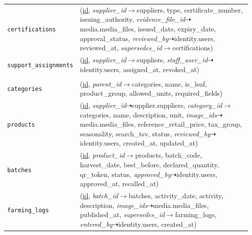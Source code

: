 \begin{longtable}{L{3.10cm} L{11.90cm}}
\texttt{certifications} & (\underline{id}, \textit{supplier\_\allowbreak{}id}$\rightarrow$suppliers, type, certificate\_\allowbreak{}number, issuing\_\allowbreak{}authority, \textit{evidence\_\allowbreak{}file\_\allowbreak{}id}$\dashrightarrow$media.media\_\allowbreak{}files, issued\_\allowbreak{}date, expiry\_\allowbreak{}date, approval\_\allowbreak{}status, \textit{reviewed\_\allowbreak{}by}$\dashrightarrow$identity.users, reviewed\_\allowbreak{}at, \textit{supersedes\_\allowbreak{}id}$\rightarrow$certifications) \\
\texttt{support\_\allowbreak{}assignments} & (\underline{id}, \textit{supplier\_\allowbreak{}id}$\rightarrow$suppliers, \textit{staff\_\allowbreak{}user\_\allowbreak{}id}$\dashrightarrow$identity.users, assigned\_\allowbreak{}at, revoked\_\allowbreak{}at) \\
 \\
\texttt{categories} & (\underline{id}, \textit{parent\_\allowbreak{}id}$\rightarrow$categories, name, is\_\allowbreak{}leaf, product\_\allowbreak{}group, allowed\_\allowbreak{}units, required\_\allowbreak{}fields) \\
\texttt{products} & (\underline{id}, \textit{supplier\_\allowbreak{}id}$\dashrightarrow$supplier.suppliers, \textit{category\_\allowbreak{}id}$\rightarrow$categories, name, description, unit, \textit{image\_\allowbreak{}ids}$\dashrightarrow$media.media\_\allowbreak{}files, reference\_\allowbreak{}retail\_\allowbreak{}price, tax\_\allowbreak{}group, seasonality, search\_\allowbreak{}tsv, status, \textit{reviewed\_\allowbreak{}by}$\dashrightarrow$identity.users, created\_\allowbreak{}at, updated\_\allowbreak{}at) \\
\texttt{batches} & (\underline{id}, \textit{product\_\allowbreak{}id}$\rightarrow$products, batch\_\allowbreak{}code, harvest\_\allowbreak{}date, best\_\allowbreak{}before, declared\_\allowbreak{}quantity, qr\_\allowbreak{}token, status, \textit{approved\_\allowbreak{}by}$\dashrightarrow$identity.users, approved\_\allowbreak{}at, recalled\_\allowbreak{}at) \\
\texttt{farming\_\allowbreak{}logs} & (\underline{id}, \textit{batch\_\allowbreak{}id}$\rightarrow$batches, activity\_\allowbreak{}date, activity, description, \textit{image\_\allowbreak{}ids}$\dashrightarrow$media.media\_\allowbreak{}files, published\_\allowbreak{}at, \textit{supersedes\_\allowbreak{}id}$\rightarrow$farming\_\allowbreak{}logs, \textit{entered\_\allowbreak{}by}$\dashrightarrow$identity.users, created\_\allowbreak{}at) \\

\end{longtable}
